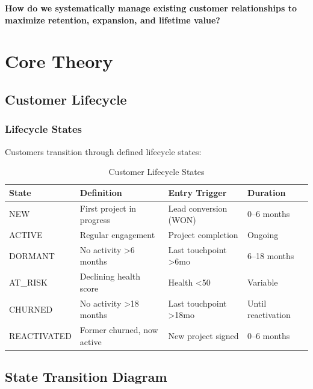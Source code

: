 \begin{tcolorbox}[colback=red!5!white, colframe=red!75!black,
    title=The Fundamental Question]
\textbf{How do we systematically manage existing customer relationships to maximize retention, expansion, and lifetime value?}
\end{tcolorbox}


\section{Core Theory}
\label{sec:bp-theory}

\subsection{Customer Lifecycle}
\label{sec:bp-lifecycle}

\subsubsection{Lifecycle States}

Customers transition through defined lifecycle states:

\begin{table}[htbp]
\centering
\caption{Customer Lifecycle States}
\label{tab:bp-lifecycle-states}
\renewcommand{\arraystretch}{1.3}
\begin{tabular}{@{}llll@{}}
\toprule
\textbf{State} & \textbf{Definition} & \textbf{Entry Trigger} & \textbf{Duration} \\
\midrule
NEW & First project in progress & Lead conversion (WON) & 0--6 months \\
ACTIVE & Regular engagement & Project completion & Ongoing \\
DORMANT & No activity >6 months & Last touchpoint >6mo & 6--18 months \\
AT\_RISK & Declining health score & Health <50 & Variable \\
CHURNED & No activity >18 months & Last touchpoint >18mo & Until reactivation \\
REACTIVATED & Former churned, now active & New project signed & 0--6 months \\
\bottomrule
\end{tabular}
\end{table}

\subsection{State Transition Diagram}

